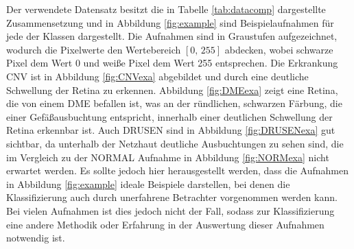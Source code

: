 Der verwendete Datensatz besitzt die in Tabelle \ref{tab:datacomp} dargestellte Zusammensetzung und in Abbildung \ref{fig:example} sind Beispielaufnahmen für jede der Klassen dargestellt. Die Aufnahmen sind in Graustufen aufgezeichnet, wodurch die Pixelwerte den Wertebereich $[0,\,255]$ abdecken, wobei schwarze Pixel dem Wert 0 und wei{\ss}e Pixel dem Wert 255 entsprechen. Die Erkrankung CNV ist in Abbildung \ref{fig:CNVexa} abgebildet und durch eine deutliche Schwellung der Retina zu erkennen. Abbildung \ref{fig:DMEexa} zeigt eine Retina, die von einem DME befallen ist, was an der ründlichen, schwarzen Färbung, die einer Gefä{\ss}ausbuchtung entspricht, innerhalb einer deutlichen Schwellung der Retina erkennbar ist. Auch DRUSEN sind in Abbildung \ref{fig:DRUSENexa} gut sichtbar, da unterhalb der Netzhaut deutliche Ausbuchtungen zu sehen sind, die im Vergleich zu der NORMAL Aufnahme in Abbildung \ref{fig:NORMexa} nicht erwartet werden. Es sollte jedoch hier herausgestellt werden, dass die Aufnahmen in Abbildung \ref{fig:example} ideale Beispiele darstellen, bei denen die Klassifizierung auch durch unerfahrene Betrachter vorgenommen werden kann. Bei vielen Aufnahmen ist dies jedoch nicht der Fall, sodass zur Klassifizierung eine andere Methodik oder Erfahrung in der Auswertung dieser Aufnahmen notwendig ist.  
